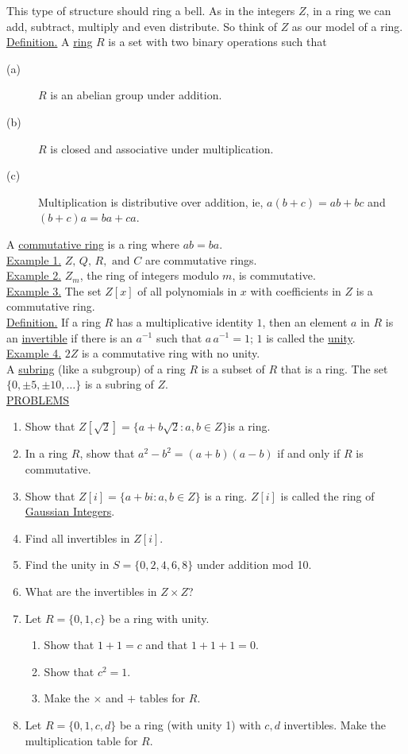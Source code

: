 \documentclass[12pt]{book}
\theoremstyle{definition}
\begin{document}
\quad This type of structure should ring a bell.  As in the integers $Z$, in a ring we can add, subtract, multiply and even distribute.  So think of $Z$ as our model of a ring.\\
\underline{Definition.} A \underline{ring} $R$ is a set with two binary operations such that
\begin{description}
\item[\quad(a)]$R$ is an abelian group under addition.
\item[\quad(b)]$R$ is closed and associative under multiplication.
\item[\quad(c)]Multiplication is distributive over addition, ie, $a(b+c)=ab+bc$ and $(b+c)a=ba+ca$.
\end{description}
A \underline{commutative ring} is a ring where $ab=ba$.\\[.1in]
\underline{Example 1.} $Z,\,Q,\,R, \text{ and } C$ are commutative rings.\\
\underline{Example 2.} $Z_m$, the ring of integers modulo $m$, is commutative.\\
\underline{Example 3.} The set $Z[x]$ of all polynomials in $x$ with coefficients in $Z$ is a commutative ring.\\[.1in]
%
\underline{Definition.} If a ring $R$ has a multiplicative identity $1$, then an element $a$ in $R$ is an \underline{invertible} if there is an $a^{-1}$ such that $a\,a^{-1}=1$; $1$ is called the \underline{unity}.\\
\underline{Example 4.} $2Z$ is a commutative ring with no unity.\\[.1in]

A \underline{subring} (like a subgroup) of a ring $R$ is a subset of $R$ that is a ring.  The set $\{0,\pm5,\pm10,\dots\}$ is a subring of $Z$.\\[.1in]

\underline{PROBLEMS}
\begin{enumerate}
\item Show that $Z[\sqrt2]=\{a+b\sqrt2:a,b\in Z\} $is a ring.
\item In a ring $R$, show that $a^2-b^2=(a+b)(a-b)$ if and only if $R$ is commutative.
\item Show that $Z[i]=\{a+bi: a,b \in Z\}$ is  a ring.  $Z[i]$ is called the ring of \underline{Gaussian Integers}.
\item Find all invertibles in $Z[i]$.
\item Find the unity in $S=\{0,2,4,6,8\}$ under addition mod 10.
\item What are the invertibles in $Z\times Z$?
\item Let $R=\{0,1,c\}$ be a ring with unity.
\begin{enumerate}
\item Show that $1+1=c$ and that $1+1+1=0$.
\item Show that $c^2=1$.
\item Make the $\times$ and $+$ tables for $R$.
\end{enumerate}
\item Let $R=\{0,1,c,d\}$ be a ring (with unity 1) with $c,d$ invertibles.  Make the multiplication table for $R$.
\end{enumerate}
\end{document}
